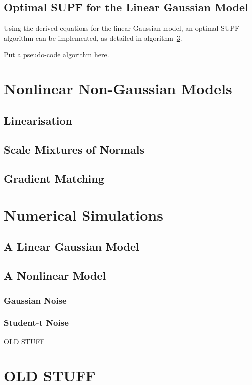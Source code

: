 \documentclass[a4paper,10pt]{article}
\begin{document}
\subsection{Optimal SUPF for the Linear Gaussian Model}

Using the derived equations for the linear Gaussian model, an optimal SUPF algorithm can be implemented, as detailed in algorithm~\ref{}.

{\meta Put a pseudo-code algorithm here.}



\section{Nonlinear Non-Gaussian Models}
\subsection{Linearisation}
\subsection{Scale Mixtures of Normals}
\subsection{Gradient Matching}



\section{Numerical Simulations}
\subsection{A Linear Gaussian Model}
\subsection{A Nonlinear Model}
\subsubsection{Gaussian Noise}
\subsubsection{Student-t Noise}

{\meta OLD STUFF}





\section{OLD STUFF}
\end{document}
